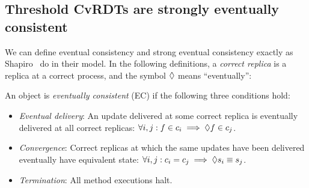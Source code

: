\subsection{Threshold CvRDTs are strongly eventually consistent}


We can define eventual consistency and strong eventual consistency
exactly as Shapiro \etal~do in their model.  In the following
definitions, a \emph{correct replica} is a replica at a correct
process, and the  symbol $\lozenge$ means ``eventually'':



\begin{definition}
  \label{def:eventual-consistency}
  An object is \emph{eventually consistent} (EC) if the following three
  conditions hold:
  \begin{itemize}
    \item \emph{Eventual delivery}: An update delivered at some
      correct replica is eventually delivered at all correct replicas:
      $\forall i, j : f \in c_i \implies \lozenge f \in c_j$.
    \item \emph{Convergence}: Correct replicas at which the same
      updates have been delivered eventually have equivalent state:
      $\forall i, j : c_i = c_j \implies \lozenge s_i \equiv s_j$.
    \item \emph{Termination}: All method executions halt.
  \end{itemize}
\end{definition}


